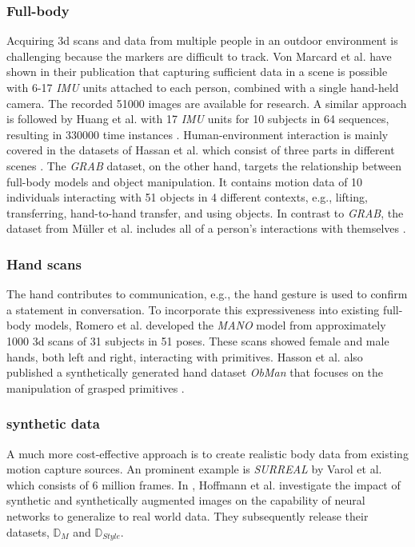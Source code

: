 \subsubsection{Full-body}
Acquiring 3d scans and data from multiple people in an outdoor environment is challenging because the markers are difficult to track. Von Marcard et al. have shown in their publication that capturing sufficient data in a scene is possible with 6-17 \emph{IMU} units attached to each person, combined with a single hand-held camera. The recorded 51000 images are available for research.\cite{vip} A similar approach is followed by Huang et al. with 17 \emph{IMU} units for 10 subjects in 64 sequences, resulting in 330000 time instances \cite{dip}. Human-environment interaction is mainly covered in the datasets of Hassan et al. which consist of three parts in different scenes \cite{prox}. The \emph{GRAB} dataset, on the other hand, targets the relationship between full-body models and object manipulation. It contains motion data of 10 individuals interacting with 51 objects in 4 different contexts, e.g., lifting, transferring, hand-to-hand transfer, and using objects\cite{grab}. In contrast to \emph{GRAB}, the dataset from Müller et al. includes all of a person's interactions with themselves \cite{tuch}.

\subsubsection{Hand scans}
The hand contributes to communication, e.g., the hand gesture is used to confirm a statement in conversation. To incorporate this expressiveness into existing full-body models, Romero et al. developed the \emph{MANO} model from approximately 1000 3d scans of 31 subjects in 51 poses. These scans showed female and male hands, both left and right, interacting with primitives. \cite{mano} 
Hasson et al. also published a synthetically generated hand dataset \emph{ObMan} that focuses on the manipulation of grasped primitives \cite{obman}.

\subsubsection{synthetic data}
A much more cost-effective approach is to create realistic body data from existing motion capture sources. An prominent example is \emph{SURREAL} by Varol et al. which consists of 6 million frames\cite{surreal}. In \cite{ltsh}, Hoffmann et al. investigate the impact of synthetic and synthetically augmented images on the capability of neural networks to generalize to real world data. They subsequently release their datasets, $\mathbb{D}_{M}$ and $\mathbb{D}_{Style}$.

